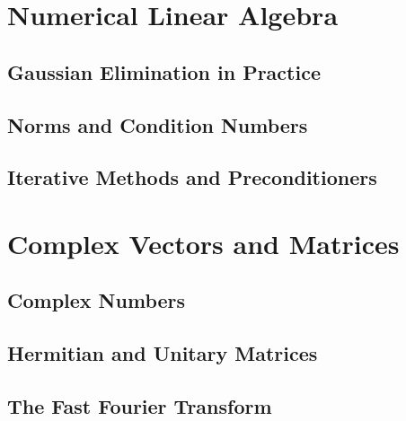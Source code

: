 \documentclass{book}
\begin{document}
\chapter{Numerical Linear Algebra}
\section{Gaussian Elimination in Practice}

\section{Norms and Condition Numbers}

\section{Iterative Methods and Preconditioners}










\chapter{Complex Vectors and Matrices}
\section{Complex Numbers}

\section{Hermitian and Unitary Matrices}

\section{The Fast Fourier Transform}
\end{document}
